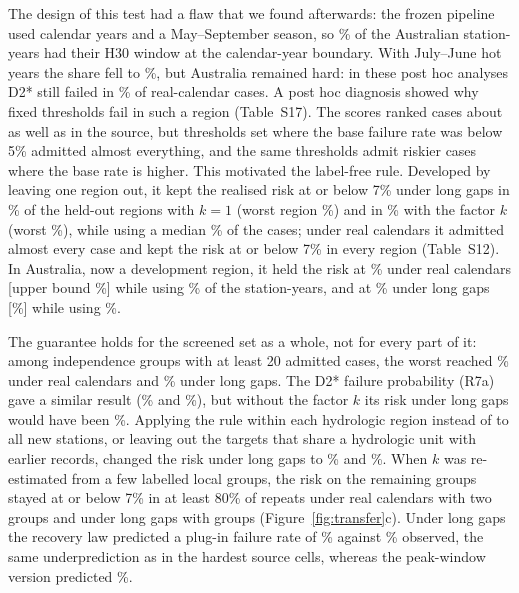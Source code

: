 \documentclass[draft]{agujournal2025}
\begin{document}
The design of this test had a flaw that we found afterwards: the frozen pipeline used calendar years and a May--September season, so \TAuEdgeBefore\% of the Australian station-years had their H30 window at the calendar-year boundary. With July--June hot years the share fell to \TAuEdgeAfter\%, but Australia remained hard: in these post hoc analyses D2* still failed in \TAuDevUnscreenedDeploy\% of real-calendar cases. A post hoc diagnosis showed why fixed thresholds fail in such a region (Table~S17). The scores ranked cases about as well as in the source, but thresholds set where the base failure rate was below 5\% admitted almost everything, and the same thresholds admit riskier cases where the base rate is higher. This motivated the label-free rule. Developed by leaving one region out, it kept the realised risk at or below 7\% under long gaps in \TErShareKOneMech\% of the \TErRegions{} held-out regions with $k=1$ (worst region \TErWorstKOneMech\%) and in \TErShareMech\% with the factor $k$ (worst \TErWorstMech\%), while using a median \TErMedianRetMech\% of the cases; under real calendars it admitted almost every case and kept the risk at or below 7\% in every region (Table~S12). In Australia, now a development region, it held the risk at \TAuDevRiskDeploy\% under real calendars [upper bound \TAuDevRiskDeployHigh\%] while using \TAuDevRetDeploy\% of the station-years, and at \TAuDevRiskMech\% under long gaps [\TAuDevRiskMechHigh\%] while using \TAuDevRetMech\%.


\label{sec:transfer}

The guarantee holds for the screened set as a whole, not for every part of it: among independence groups with at least 20 admitted cases, the worst reached \TNewWorstGroupDeploy\% under real calendars and \TNewWorstGroupMech\% under long gaps. The D2* failure probability (R7a) gave a similar result (\TNewRiskADeploy\% and \TNewRiskAMech\%), but without the factor $k$ its risk under long gaps would have been \TNewRiskAKOneMech\%. Applying the rule within each hydrologic region instead of to all new stations, or leaving out the targets that share a hydrologic unit with earlier records, changed the risk under long gaps to \TNewRiskPerRegion\% and \TNewRiskNoPrior\%. When $k$ was re-estimated from a few labelled local groups, the risk on the remaining groups stayed at or below 7\% in at least 80\% of repeats under real calendars with two groups and under long gaps with \TNewLocalGroups{} groups (Figure~\ref{fig:transfer}c). Under long gaps the recovery law predicted a plug-in failure rate of \TNewLawMech\% against \TNewObservedMech\% observed, the same underprediction as in the hardest source cells, whereas the peak-window version predicted \TNewLawPMech\%.
\end{document}
